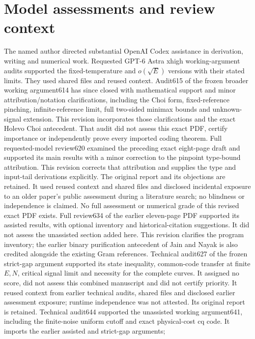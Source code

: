 \documentclass[11pt]{article}
\begin{document}
\section{Model assessments and review context}
The named author directed substantial OpenAI Codex assistance in
derivation, writing and numerical work.
Requested GPT-6 Astra xhigh working-argument audits supported the
fixed-temperature and \(o(\sqrt E)\) versions with their stated limits.
They used shared files and reused context.
Audit615 of the frozen broader working argument614 has since closed
with mathematical support and minor attribution/notation clarifications,
including the Choi form, fixed-reference pinching, infinite-reference
limit, full two-sided minimax bounds and unknown-signal extension.
This revision incorporates those clarifications and the exact Holevo
Choi antecedent. That audit did not assess this exact PDF, certify
importance or independently prove every imported coding theorem.
Full requested-model review620 examined the preceding exact eight-page
draft and supported its main results with a minor correction to the
pinpoint type-bound attribution. This revision corrects that attribution
and supplies the type and input-tail derivations explicitly.
The original report and its objections are retained.
It used reused context and shared files and disclosed incidental exposure
to an older paper's public assessment during a literature search;
no blindness or independence is claimed.
No full assessment or numerical grade of this revised exact PDF exists.
Full review634 of the earlier eleven-page PDF supported its assisted
results, with optional inventory and historical-citation suggestions.
It did not assess the unassisted section added here. This revision
clarifies the program inventory; the earlier binary purification
antecedent of Jain and Nayak \cite[Lemma3.7, Corollary3.8]{jainnayak}
is also credited alongside the existing Gram references.
Technical audit627 of the frozen strict-gap argument supported its
state inequality, common-code transfer at finite \(E,N\), critical
signal limit and necessity for the complete curves.
It assigned no score, did not assess this combined manuscript and did
not certify priority. It reused context from earlier technical audits,
shared files and disclosed earlier assessment exposure; runtime
independence was not attested. Its original report is retained.
Technical audit644 supported the unassisted working argument641,
including the finite-noise uniform cutoff and exact physical-cost
cq code. It imports the earlier assisted and strict-gap arguments;
\end{document}
